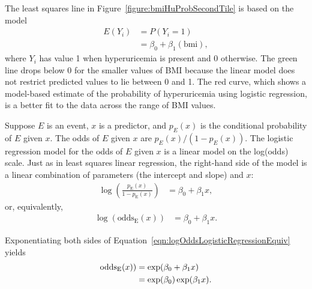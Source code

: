 The least squares line in Figure~\ref{figure:bmiHuProbSecondTile} is based on the model
\begin{align*}
  E(Y_i) &= P(Y_i = 1) \\
         &= \beta_0 + \beta_1 (\text{bmi}),
\end{align*}
where $Y_i$ has value 1 when hyperuricemia is present and 0 otherwise.  The green line drops below 0 for the smaller values of BMI because the linear model does not restrict predicted values to lie between 0 and 1.  The red curve, which shows a model-based estimate of the probability of hyperuricemia using logistic regression, is a better fit to the data across the range of BMI values. 

Suppose $E$ is an event, $x$ is a predictor, and $p_{E}(x)$ is the conditional probability of $E$ given $x$. The odds of $E$ given $x$ are $p_{E}(x)/(1 - p_{E}(x))$. The logistic regression model for the odds of $E$ given $x$ is a linear model on the log(odds) scale. Just as in least squares linear regression, the right-hand side of the model is a linear combination of parameters (the intercept and slope) and $x$: 
\begin{align}
   \log\left(\frac{p_{\text{E}}(x)}
  {1 - p_\text{E}(x)}\right) &= \beta_0 + \beta_1 x,
  \label{eqn:logOddsLogisticRegression}
\end{align}
or, equivalently,
\begin{align}
 \log(\text{odds}_\text{E}(x)) &= \beta_0 + \beta_1 x.
   \label{eqn:logOddsLogisticRegressionEquiv}
\end{align}

Exponentiating both sides of Equation~\ref{eqn:logOddsLogisticRegressionEquiv} yields
\begin{align}
  \text{odds}_\text{E}(x)) &= \exp(\beta_0 + \beta_1 x) \notag \\
  &= \exp(\beta_0) \exp(\beta_1 x).
    \label{eqn:oddsLogisticRegression}
\end{align}


